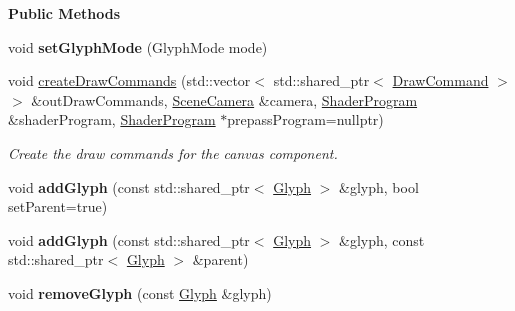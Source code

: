 \begin{Indent}\textbf{ Public Methods}\par
\begin{DoxyCompactItemize}
\item 
\mbox{\label{classrev_1_1_canvas_component_ad38cc4a5b7fc425589041dc2db01050d}} 
void {\bfseries set\+Glyph\+Mode} (Glyph\+Mode mode)
\item 
\mbox{\label{classrev_1_1_canvas_component_acbdb374b706733c1a000f792949ef4d4}} 
void \mbox{\hyperlink{classrev_1_1_canvas_component_acbdb374b706733c1a000f792949ef4d4}{create\+Draw\+Commands}} (std\+::vector$<$ std\+::shared\+\_\+ptr$<$ \mbox{\hyperlink{classrev_1_1_draw_command}{Draw\+Command}} $>$$>$ \&out\+Draw\+Commands, \mbox{\hyperlink{classrev_1_1_scene_camera}{Scene\+Camera}} \&camera, \mbox{\hyperlink{classrev_1_1_shader_program}{Shader\+Program}} \&shader\+Program, \mbox{\hyperlink{classrev_1_1_shader_program}{Shader\+Program}} $\ast$prepass\+Program=nullptr)
\begin{DoxyCompactList}\small\item\em Create the draw commands for the canvas component. \end{DoxyCompactList}\item 
\mbox{\label{classrev_1_1_canvas_component_ae66d5fab87de6ff1b092391738f8029b}} 
void {\bfseries add\+Glyph} (const std\+::shared\+\_\+ptr$<$ \mbox{\hyperlink{classrev_1_1_glyph}{Glyph}} $>$ \&glyph, bool set\+Parent=true)
\item 
\mbox{\label{classrev_1_1_canvas_component_a95812ec81bda9d151c59574a381aca68}} 
void {\bfseries add\+Glyph} (const std\+::shared\+\_\+ptr$<$ \mbox{\hyperlink{classrev_1_1_glyph}{Glyph}} $>$ \&glyph, const std\+::shared\+\_\+ptr$<$ \mbox{\hyperlink{classrev_1_1_glyph}{Glyph}} $>$ \&parent)
\item 
\mbox{\label{classrev_1_1_canvas_component_a81d914149431534f44f2be44e950bbe0}} 
void {\bfseries remove\+Glyph} (const \mbox{\hyperlink{classrev_1_1_glyph}{Glyph}} \&glyph)
\item 
\mbox{\label{classrev_1_1_canvas_component_aadbafdf25d69a23c64f405be6849d50b}} 
$$
\end{DoxyCompactItemize}
\end{Indent}

